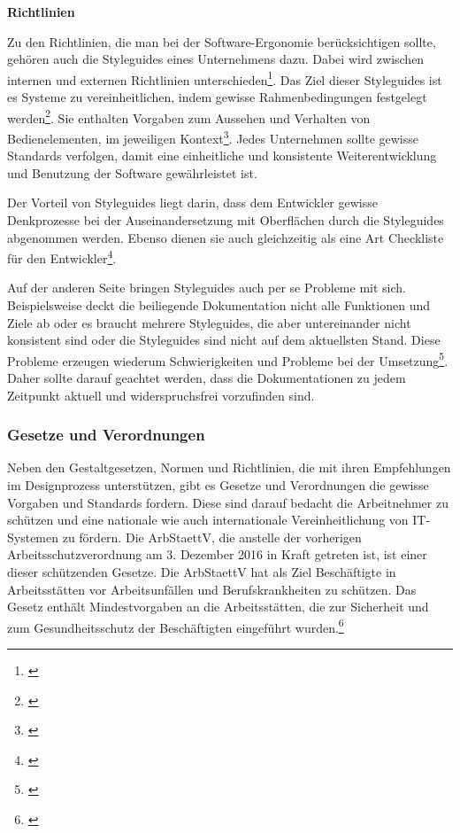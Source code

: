 \textbf{Richtlinien}

Zu den Richtlinien, die man bei der Software-Ergonomie berücksichtigen sollte, gehören auch die Styleguides eines Unternehmens dazu. Dabei wird zwischen internen und externen Richtlinien unterschieden\footnote{\cite[vgl.][74]{Richter2013}}. Das Ziel dieser Styleguides ist es Systeme zu vereinheitlichen, indem gewisse Rahmenbedingungen festgelegt werden\footnote{\cite[vgl.][]{Sarodnick2011}}. Sie enthalten Vorgaben zum Aussehen und Verhalten von Bedienelementen, im jeweiligen Kontext\footnote{\cite[vgl.][72]{Richter2013}}. Jedes Unternehmen sollte gewisse Standards verfolgen, damit eine einheitliche und konsistente Weiterentwicklung und Benutzung der Software gewährleistet ist.

Der Vorteil von Styleguides liegt darin, dass dem Entwickler gewisse Denkprozesse bei der Auseinandersetzung mit Oberflächen durch die Styleguides abgenommen werden. Ebenso dienen sie auch gleichzeitig als eine Art Checkliste für den Entwickler\footnote{\cite[vgl.][214]{Thomaschewski2013}}.

Auf der anderen Seite bringen Styleguides auch per se Probleme mit sich. Beispielsweise deckt die beiliegende Dokumentation nicht alle Funktionen und Ziele ab oder es braucht mehrere Styleguides, die aber untereinander nicht konsistent sind oder die Styleguides sind nicht auf dem aktuellsten Stand. Diese Probleme erzeugen wiederum Schwierigkeiten und Probleme bei der Umsetzung\footnote{\cite[vgl.][215]{Thomaschewski2013}}. Daher sollte darauf geachtet werden, dass die Dokumentationen zu jedem Zeitpunkt aktuell und widerspruchsfrei vorzufinden sind.


\subsubsection{Gesetze und Verordnungen}
\label{sec:gesetzeUndVerordnungen}
Neben den Gestaltgesetzen, Normen und Richtlinien, die mit ihren Empfehlungen im Designprozess unterstützen, gibt es Gesetze und Verordnungen die gewisse Vorgaben und Standards fordern. Diese sind darauf bedacht die Arbeitnehmer zu schützen und eine nationale wie auch internationale Vereinheitlichung von IT-Systemen zu fördern. Die \gls{ArbStaettV}, die anstelle der vorherigen Arbeitsschutzverordnung am 3. Dezember 2016 in Kraft getreten ist, ist einer dieser schützenden Gesetze. Die \gls{ArbStaettV} hat als Ziel Beschäftigte in Arbeitsstätten vor Arbeitsunfällen und Berufskrankheiten zu schützen. Das Gesetz enthält Mindestvorgaben an die Arbeitsstätten, die zur Sicherheit und zum Gesundheitsschutz der Beschäftigten eingeführt wurden.\footnote{\cite[vgl.][]{BAuA}}

